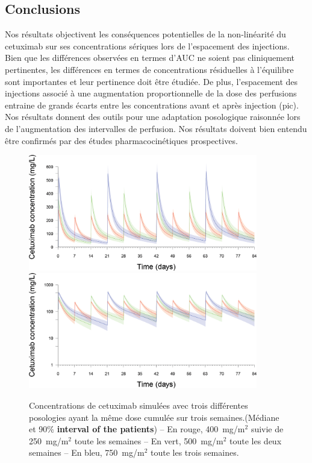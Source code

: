 \subsection{Conclusions}
Nos résultats objectivent les conséquences potentielles de la non-linéarité du cetuximab sur ses concentrations sériques lors de l'espacement des injections. Bien que les différences observées en termes d'\gls{AUC} ne soient pas cliniquement pertinentes, les différences en termes de concentrations résiduelles à l'équilibre sont importantes et leur pertinence doit être étudiée. De plus, l'espacement des injections associé à une augmentation proportionnelle de la dose des perfusions entraine de grands écarts entre les concentrations avant et après injection (pic). Nos résultats donnent des outils pour une adaptation posologique raisonnée lors de l'augmentation des intervalles de perfusion. Nos résultats doivent bien entendu être confirmés par des études pharmacocinétiques prospectives.
\begin{figure}[htbp]
	\centering
		\includegraphics[width=10cm]{figures/raster/FIG_32a}
		\includegraphics[width=10cm]{figures/raster/FIG_32b}
	\caption{Concentrations de cetuximab simulées avec trois différentes posologies ayant la même dose cumulée sur trois semaines.(Médiane et 90\% \textbf{interval of the patients}) – En rouge, 400~mg/m$^2$ suivie de 250~mg/m$^2$ toute les semaines – En vert, 500~mg/m$^2$ toute les deux semaines – En bleu, 750~mg/m$^2$ toute les trois semaines.}
	\label{fig:32}
\end{figure}
